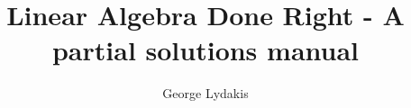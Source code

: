 \documentclass[a4paper, 11pt]{book}
\begin{document}
\title{Linear Algebra Done Right - A partial solutions manual}
\author{George Lydakis}
\maketitle

\setcounter{tocdepth}{2}
\tableofcontents

\renewcommand{\thesection}{\thechapter.\Alph{section}}

\setcounter{chapter}{-1} 
%
%
\setcounter{chapter}{4} 






\end{document}
